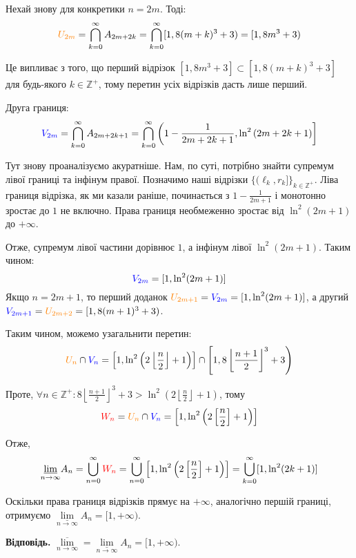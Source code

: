 \documentclass[12pt]{extarticle}
\begin{document}
Нехай знову для конкретики $n=2m$. Тоді:
\[
\textcolor{orange}{U_{2m}} = \bigcap_{k=0}^{\infty}A_{2m+2k} = \bigcap_{k=0}^{\infty}[1,8(m+k)^3+3) = [1,8m^3+3)
\]

Це випливає з того, що перший відрізок $[1,8m^3+3] \subset [1,8(m+k)^3+3]$ для будь-якого $k \in \mathbb{Z}^+$, тому перетин усіх відрізків дасть лише перший. 

Друга границя:
\[
\textcolor{blue}{V_{2m}} = \bigcap_{k=0}^{\infty}A_{2m+2k+1} = \bigcap_{k=0}^{\infty}\left(1 - \frac{1}{2m+2k+1}, \ln^2\left(2m+2k+1\right)\right]
\]

Тут знову проаналізуємо акуратніше. Нам, по суті, потрібно знайти супремум лівої границі та інфінум правої. Позначимо наші відрізки $\{(\ell_k, r_k]\}_{k \in \mathbb{Z}^+}$. Ліва границя відрізка, як ми казали раніше, починається з $1 - \frac{1}{2m+1}$ і монотонно зростає до $1$ не включно. Права границя необмеженно зростає від $\ln^2(2m+1)$ до $+\infty$. 

Отже, супремум лівої частини дорівнює $1$, а інфінум лівої $\ln^2(2m+1)$. Таким чином:
\[
\textcolor{blue}{V_{2m}} = [1, \ln^2(2m+1)]
\]
Якщо $n=2m+1$, то перший доданок $\textcolor{orange}{U_{2m+1}} = \textcolor{blue}{V_{2m}} = [1,\ln^2(2m+1)]$, а другий $\textcolor{blue}{V_{2m+1}} = \textcolor{orange}{U_{2m+2}} = [1,8(m+1)^3+3)$. 

Таким чином, можемо узагальнити перетин:
\[
\textcolor{orange}{U_n} \cap \textcolor{blue}{V_n} = \left[1,\ln^2\left(2\left\lfloor\frac{n}{2}\right\rfloor+1\right)\right] \cap \left[1,8\left\lfloor\frac{n+1}{2}\right\rfloor^3+3\right)
\]

Проте, $\forall n \in \mathbb{Z}^+: 8\left\lfloor\frac{n+1}{2}\right\rfloor^3+3 > \ln^2\left(2\left\lfloor\frac{n}{2}\right\rfloor+1\right)$, тому
\[
\textcolor{red}{W_n} = \textcolor{orange}{U_n} \cap \textcolor{blue}{V_n} = \left[1,\ln^2\left(2\left[\frac{n}{2}\right]+1\right)\right]
\]

Отже,
\[
\underset{n \to \infty}{\underline{\lim}}A_n = \bigcup_{n=0}^{\infty}\textcolor{red}{W_n} = \bigcup_{n=0}^{\infty}\left[1,\ln^2\left(2\left[\frac{n}{2}\right]+1\right)\right] = \bigcup_{k=0}^{\infty} [1,\ln^2(2k+1)]
\]

Оскільки права границя відрізків прямує на $+\infty$, аналогічно першій границі, отримуємо $\underset{n \to \infty}{\underline{\lim}}A_n = [1,+\infty)$.

\textbf{Відповідь.} $\underset{n \to \infty}{\overline{\lim}} = \underset{n \to \infty}{\underline{\lim}}A_n=[1,+\infty)$.
\end{document}
